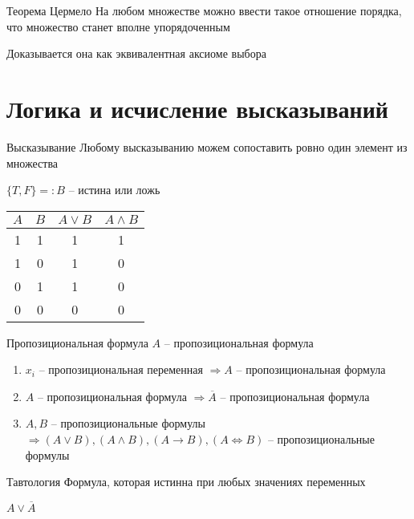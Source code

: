 \documentclass[12pt]{article}
\begin{document}
\begin{theo}{Теорема Цермело}
    На любом множестве можно ввести такое отношение порядка, что множество станет вполне упорядоченным
\end{theo}

\begin{Remark}{}
    Доказывается она как эквивалентная аксиоме выбора
\end{Remark}

\section{Логика и исчисление высказываний}

\begin{defin}{Высказывание}
    Любому высказыванию можем сопоставить ровно один элемент из множества 
    
    $\{T, F\} =: B$ -- истина или ложь
\end{defin}

\begin{tabular}{cc|c|c}
    $A$ & $B$ & $A \lor B$ & $A \land B$ \\
    \hline
    1 & 1 & 1 & 1 \\
    1 & 0 & 1 & 0 \\
    0 & 1 & 1 & 0 \\
    0 & 0 & 0 & 0
\end{tabular}

\begin{defin}{Пропозициональная формула}
    $A$ -- пропозициональная формула

    \begin{enumerate}
        \item $x_i$ -- пропозициональная переменная $\Rightarrow A$ -- пропозициональная формула
        \item $A$ -- пропозициональная формула $\Rightarrow \overline{A}$ -- пропозициональная формула
        \item $A, B$ -- пропозициональные формулы $\Rightarrow (A \lor B), (A \land B), (A \rightarrow B), (A \Leftrightarrow B)$ -- пропозициональные формулы
    \end{enumerate}
\end{defin}

\begin{defin}{Тавтология}
    Формула, которая истинна при любых значениях переменных
\end{defin}

\begin{Example}{}
    $A \lor \overline{A}$ 
\end{Example}
\end{document}
